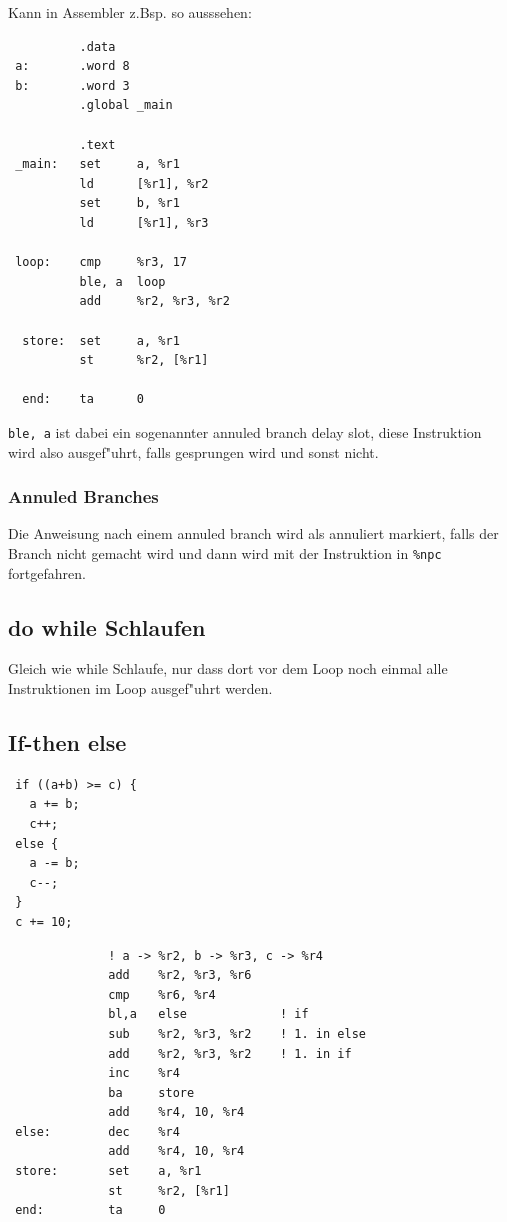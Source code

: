 \documentclass[german, 10pt, a4paper, twocolumn]{scrartcl}
\begin{document}
Kann in Assembler z.Bsp. so ausssehen:
\begin{verbatim}
          .data
 a:       .word 8
 b:       .word 3
          .global _main
	  
          .text
 _main:   set     a, %r1
          ld      [%r1], %r2
          set     b, %r1
          ld      [%r1], %r3

 loop:    cmp     %r3, 17
          ble, a  loop
          add     %r2, %r3, %r2

  store:  set     a, %r1
          st      %r2, [%r1]

  end:    ta      0
\end{verbatim}

\verb#ble, a# ist dabei ein sogenannter annuled branch delay slot, diese Instruktion wird also ausgef"uhrt, falls gesprungen wird und sonst nicht.

\subsubsection{Annuled Branches}

Die Anweisung nach einem annuled branch wird als annuliert markiert, falls der Branch nicht gemacht wird und dann wird mit der Instruktion in \verb#%npc# fortgefahren. 

\subsection{do while Schlaufen}

Gleich wie while Schlaufe, nur dass dort vor dem Loop noch einmal alle Instruktionen im Loop ausgef"uhrt werden.

\subsection{If-then else}

\begin{verbatim}
 if ((a+b) >= c) {
   a += b;
   c++;
 else {
   a -= b;
   c--;
 }
 c += 10;
\end{verbatim}


\begin{verbatim}
              ! a -> %r2, b -> %r3, c -> %r4
              add    %r2, %r3, %r6
              cmp    %r6, %r4
              bl,a   else             ! if
              sub    %r2, %r3, %r2    ! 1. in else
              add    %r2, %r3, %r2    ! 1. in if
              inc    %r4
              ba     store
              add    %r4, 10, %r4
 else:        dec    %r4
              add    %r4, 10, %r4
 store:       set    a, %r1
              st     %r2, [%r1]
 end:         ta     0
\end{verbatim}
\end{document}
